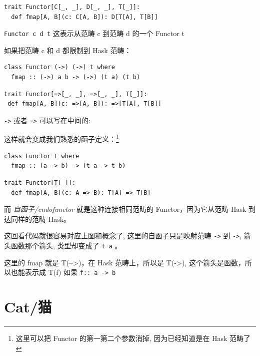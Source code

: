 \documentclass[letterspacing]{tufte-book}
\begin{document}
\begin{lstlisting}
trait Functor[C[_, _], D[_, _], T[_]]:
  def fmap[A, B](c: C[A, B]): D[T[A], T[B]]
\end{lstlisting}

\texttt{Functor c d t} 这表示从范畴 c 到范畴 d 的一个 Functor t

如果把范畴 c 和 d 都限制到 Hask 范畴：

\lstset{language=haskell,label= ,caption= ,captionpos=b,numbers=none}
\begin{lstlisting}
class Functor (->) (->) t where
  fmap :: (->) a b -> (->) (t a) (t b)
\end{lstlisting}

\lstset{language=scala,label= ,caption= ,captionpos=b,numbers=none}
\begin{lstlisting}
trait Functor[=>[_, _], =>[_, _], T[_]]:
 def fmap[A, B](c: =>[A, B]): =>[T[A], T[B]]
\end{lstlisting}

\texttt{->} 或者 \texttt{=>} 可以写在中间的:

这样就会变成我们熟悉的函子定义：\footnote{这里可以把 Functor 的第一第二个参数消掉, 因为已经知道是在 Hask 范畴了}

\lstset{language=haskell,label= ,caption= ,captionpos=b,numbers=none}
\begin{lstlisting}
class Functor t where
  fmap :: (a -> b) -> (t a -> t b)
\end{lstlisting}

\lstset{language=scala,label= ,caption= ,captionpos=b,numbers=none}
\begin{lstlisting}
trait Functor[T[_]]:
  def fmap[A, B](c: A => B): T[A] => T[B]
\end{lstlisting}

而 \emph{自函子/endofunctor} 就是这种连接相同范畴的 Functor，因为它从范畴 Hask 到达同样的范畴 Hask。

这回看代码就很容易对应上图和概念了, 这里的自函子只是映射范畴 \texttt{->} 到 \texttt{->}, 箭头函数那个箭头, 类型却变成了 \texttt{t a} 。

这里的 fmap 就是 T(\textasciitilde{}>)，在 Hask 范畴上，所以是 T(->), 这个箭头是函数，所以也能表示成 T(f) 如果 \texttt{f:: a -> b}

\chapter{Cat/猫}
\label{sec:orgb23b488}
\end{document}
